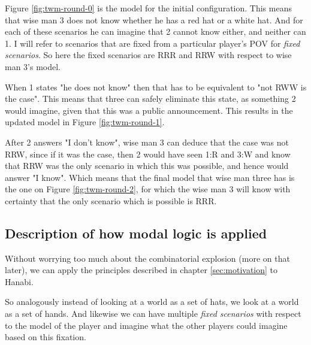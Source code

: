Figure \ref{fig:twm-round-0} is the model for the initial configuration. This means that wise man 3 does not know whether he has a red hat or a white hat. And for each of these scenarios he can imagine that 2 cannot know either, and neither can 1. I will refer to scenarios that are fixed from a particular player's POV for \emph{fixed scenarios}. So here the fixed scenarios are RRR and RRW with respect to wise man 3's model.

When 1 states "he does not know" then that has to be equivalent to "not RWW is the case". This means that three can safely eliminate this state, as something 2 would imagine, given that this was a public announcement. This results in the updated model in Figure \ref{fig:twm-round-1}.

After 2 answers "I don't know", wise man 3 can deduce that the case was not RRW, since if it was the case, then 2 would have seen 1:R and 3:W and know that RRW was the only scenario in which this was possible, and hence would answer "I know". Which means that the final model that wise man three has is the one on Figure \ref{fig:twm-round-2}, for which the wise man 3 will know with certainty that the only scenario which is possible is RRR.


\subsection{Description of how modal logic is applied} \label{sec:description-of-how-modal-logic-is_applied}
Without worrying too much about the combinatorial explosion (more on that later), we can apply the principles described in chapter \ref{sec:motivation} to Hanabi. 

So analogously instead of looking at a world as a set of hats, we look at a world as a set of hands. And likewise we can have multiple \emph{fixed scenarios} with respect to the model of the player and imagine what the other players could imagine based on this fixation. 

